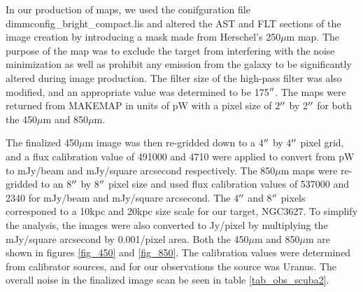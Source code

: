 In our production of maps, we used the conifguration file dimmconfig\_bright\_compact.lis and altered the AST and FLT sections of the image creation by introducing a mask made from Herschel's 250$\mu$m map.  The purpose of the map was to exclude the target from interfering with the noise minimization as well as prohibit any emission from the galaxy to be significantly altered during image production.  The filter size of the high-pass filter was also modified, and an appropriate value was determined to be 175$\mbox{$^{\prime\prime}$}$.  The maps were returned from MAKEMAP in units of pW with a pixel size of 2$\mbox{$^{\prime\prime}$}$ by 2$\mbox{$^{\prime\prime}$}$ for both the 450$\mu$m and 850$\mu$m.

The finalized 450$\mu$m image was then re-gridded down to a 4$\mbox{$^{\prime\prime}$}$ by 4$\mbox{$^{\prime\prime}$}$ pixel grid, and a flux calibration value of 491000 and 4710 were applied to convert from pW to mJy/beam and mJy/square arcsecond respectively.  The 850$\mu$m maps were re-gridded to an 8$\mbox{$^{\prime\prime}$}$ by 8$\mbox{$^{\prime\prime}$}$ pixel size and used flux calibration values of 537000 and 2340 for mJy/beam and mJy/square arcsecond.  The 4$\mbox{$^{\prime\prime}$}$  and 8$\mbox{$^{\prime\prime}$}$ pixels corresponed to a 10kpc and 20kpc size scale for our target, NGC3627.  To simplify the analysis, the images were also converted to Jy/pixel by multiplying the mJy/square arcsecond by 0.001/pixel area.  Both the 450$\mu$m and 850$\mu$m are shown in figures \ref{fig_450} and \ref{fig_850}.  The calibration values were determined from calibrator sources, and for our observations the source was Uranus.   The overall noise in the finalized image scan be seen in table \ref{tab_obs_scuba2}.

